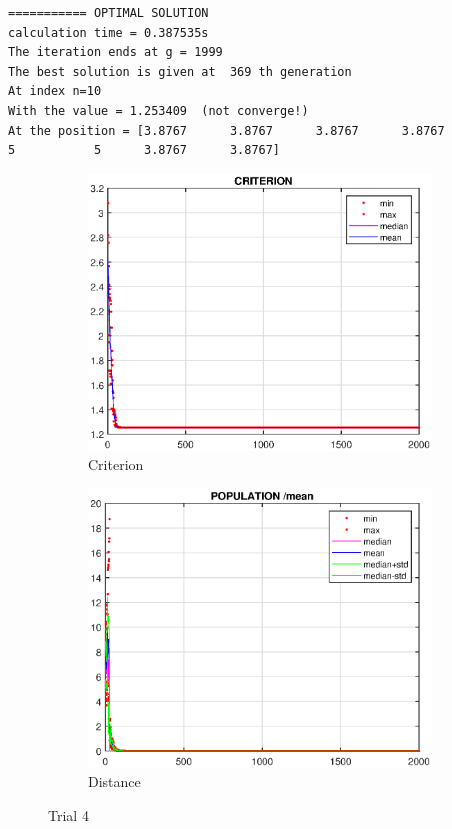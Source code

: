 \documentclass{CSArticle}[english]
\begin{document}
\begin{lstlisting}[style=RESULT,caption={trial 4}]
=========== OPTIMAL SOLUTION
calculation time = 0.387535s 
The iteration ends at g = 1999 
The best solution is given at  369 th generation 
At index n=10 
With the value = 1.253409  (not converge!)
At the position = [3.8767      3.8767      3.8767      3.8767           5           5      3.8767      3.8767] 
\end{lstlisting}
\begin{figure}[h!]
\centering
\begin{subfigure}[b]{0.45\textwidth}
         \centering
         \includegraphics[scale=0.45]{figure/Q5_c4.eps}
         \caption{Criterion}
         \label{fig:Q5_c4}
     \end{subfigure}
     \hfill
     \begin{subfigure}[b]{0.45\textwidth}
         \centering
         \includegraphics[scale=0.45]{figure/Q5_p4.eps}
         \caption{Distance}
         \label{fig:Q5_p4}
     \end{subfigure}
     \caption{Trial 4}
     \label{fig:trial4}
\end{figure}
\end{document}
